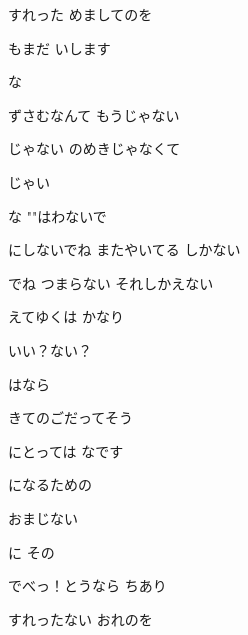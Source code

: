 \documentclass[a4paper,tate,twocolumn,12pt]{ltjtarticle}
\begin{document}
\begin{flushleft}
\noindent\begin{minipage}{\linewidth}
すれった めましてのを

もまだ いします

な 

ずさむなんて もうじゃない

じゃない のめきじゃなくて

じゃい

な ""はわないで

にしないでね またやいてる しかない

でね つまらない それしかえない
\end{minipage}

\vspace{2em}

\noindent\begin{minipage}{\linewidth}
えてゆくは かなり

いい？ない？

はなら

きてのごだってそう

にとっては なです

 になるための

おまじない

に その

でべっ！とうなら ちあり
\end{minipage}

\vspace{2em}

\noindent\begin{minipage}{\linewidth}
すれったない おれのを


\end{minipage}
\end{flushleft}
\end{document}
